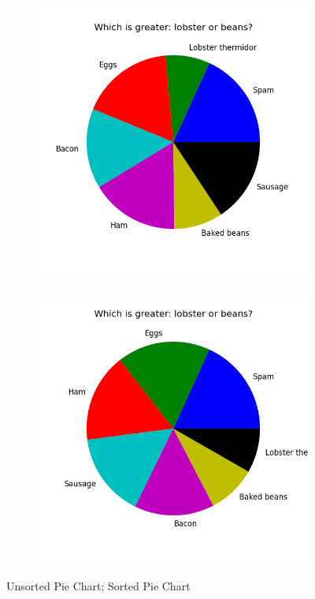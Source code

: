 \begin{figure}[h]
\centering
\begin{subfigure}{.5\textwidth}
  \centering
  \includegraphics[width=\textwidth]{pie_chart.png}
\end{subfigure}%
\begin{subfigure}{.5\textwidth}
  \centering
  \includegraphics[width=\textwidth]{pie_chart_sorted.png}
\end{subfigure}
\caption{Unsorted Pie Chart; Sorted Pie Chart }
\label{fig:piecharts}
\end{figure}


